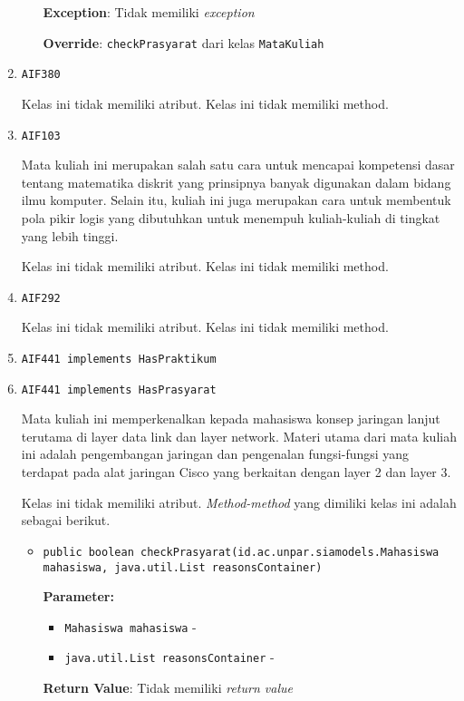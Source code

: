 \documentclass{article}
\begin{document}
\begin{enumerate}
\begin{itemize}
\textbf{Exception}: Tidak memiliki \textit{exception}

\textbf{Override}: \texttt{checkPrasyarat} dari kelas \texttt{MataKuliah}

\end{itemize}
\item \texttt{AIF380}



Kelas ini tidak memiliki atribut. Kelas ini tidak memiliki method. \item \texttt{AIF103}

Mata kuliah ini merupakan salah satu cara untuk mencapai kompetensi dasar 
 tentang matematika diskrit yang prinsipnya banyak digunakan dalam bidang 
 ilmu komputer. Selain itu, kuliah ini juga merupakan cara untuk membentuk 
 pola pikir logis yang dibutuhkan untuk menempuh kuliah-kuliah di tingkat 
 yang lebih tinggi.

Kelas ini tidak memiliki atribut. Kelas ini tidak memiliki method. \item \texttt{AIF292}



Kelas ini tidak memiliki atribut. Kelas ini tidak memiliki method. \item \texttt{AIF441 implements HasPraktikum}

\item \texttt{AIF441 implements HasPrasyarat}

Mata kuliah ini memperkenalkan kepada mahasiswa konsep jaringan lanjut
 terutama di layer data link dan layer network. Materi utama dari mata kuliah
 ini adalah pengembangan jaringan dan pengenalan fungsi-fungsi yang terdapat
 pada alat jaringan Cisco yang berkaitan dengan layer 2 dan layer 3.

Kelas ini tidak memiliki atribut. \textit{Method-method} yang dimiliki kelas ini adalah sebagai berikut.
\begin{itemize}
\item \texttt{public boolean checkPrasyarat(id.ac.unpar.siamodels.Mahasiswa mahasiswa, java.util.List reasonsContainer)}



\textbf{Parameter:}
\begin{itemize}
\item \texttt{Mahasiswa mahasiswa} - 
\item \texttt{java.util.List reasonsContainer} - 
\end{itemize}
\textbf{Return Value}: Tidak memiliki \textit{return value}


\end{itemize}
\end{enumerate}
\end{document}
